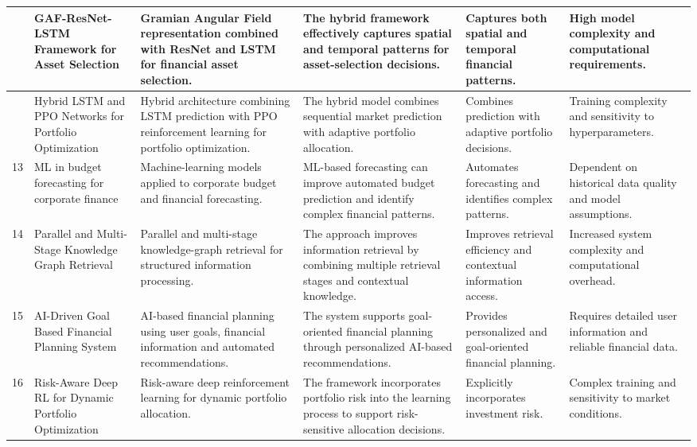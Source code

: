 {{\begin{longtable}{|>{\centering\arraybackslash}p{}|p{}|p{}|p{}|p{}|p{}|}
11 & GAF-ResNet-LSTM Framework for Asset Selection & Gramian Angular Field representation combined with ResNet and LSTM for financial asset selection. & The hybrid framework effectively captures spatial and temporal patterns for asset-selection decisions. & Captures both spatial and temporal financial patterns. & High model complexity and computational requirements. \\ \hline

12 & Hybrid LSTM and PPO Networks for Portfolio Optimization & Hybrid architecture combining LSTM prediction with PPO reinforcement learning for portfolio optimization. & The hybrid model combines sequential market prediction with adaptive portfolio allocation. & Combines prediction with adaptive portfolio decisions. & Training complexity and sensitivity to hyperparameters. \\ \hline

13 & ML in budget forecasting for corporate finance & Machine-learning models applied to corporate budget and financial forecasting. & ML-based forecasting can improve automated budget prediction and identify complex financial patterns. & Automates forecasting and identifies complex patterns. & Dependent on historical data quality and model assumptions. \\ \hline

14 & Parallel and Multi-Stage Knowledge Graph Retrieval & Parallel and multi-stage knowledge-graph retrieval for structured information processing. & The approach improves information retrieval by combining multiple retrieval stages and contextual knowledge. & Improves retrieval efficiency and contextual information access. & Increased system complexity and computational overhead. \\ \hline

15 & AI-Driven Goal Based Financial Planning System & AI-based financial planning using user goals, financial information and automated recommendations. & The system supports goal-oriented financial planning through personalized AI-based recommendations. & Provides personalized and goal-oriented financial planning. & Requires detailed user information and reliable financial data. \\ \hline

16 & Risk-Aware Deep RL for Dynamic Portfolio Optimization & Risk-aware deep reinforcement learning for dynamic portfolio allocation. & The framework incorporates portfolio risk into the learning process to support risk-sensitive allocation decisions. & Explicitly incorporates investment risk. & Complex training and sensitivity to market conditions. \\ \hline


\end{longtable}}}
